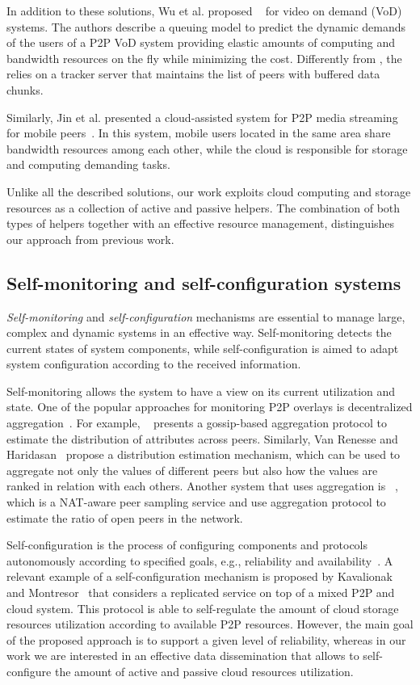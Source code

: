 {In addition to these solutions, Wu et al. proposed \cloudmedia~\cite{cloudmedia} for video on demand (VoD) systems. The authors describe a queuing model to predict the dynamic demands of the users of a P2P
VoD system providing elastic amounts of computing and bandwidth resources on the fly while minimizing the cost. Differently from \clive, the \cloudmedia relies on a tracker server that maintains the list of peers with buffered data chunks.

Similarly, Jin et al. presented a cloud-assisted system for P2P media streaming for
mobile peers~\cite{mobilecloud}. In this system, mobile users located in the same area share bandwidth resources among each other, while the cloud is responsible for storage and computing demanding tasks.


Unlike all the described solutions, our work exploits cloud computing and storage resources
as a collection of active and passive helpers. The combination of both types
of helpers together with an effective resource management, distinguishes our
approach from previous work.

\subsection{Self-monitoring and self-configuration systems}

\emph{Self-monitoring} and \emph{self-configuration} mechanisms are essential
to manage large, complex and dynamic systems in an effective way.
Self-monitoring detects the current states of system components, while
self-configuration is aimed to adapt system configuration according to the
received information.

Self-monitoring allows the system to have a view on its current utilization
and state. One of the popular approaches for monitoring P2P overlays is
decentralized aggregation~\cite{aggregation}. For example, \adam~\cite{adam2}
presents a gossip-based aggregation protocol to estimate the distribution of
attributes across peers. Similarly, Van Renesse and
Haridasan~\cite{gossipestimation} propose a distribution estimation mechanism,
which can be used to aggregate not only the values of different peers but also
how the values are ranked in relation with each others. Another system that
uses aggregation is \croupier~\cite{croupier}, which is a NAT-aware peer
sampling service and use aggregation protocol to estimate the ratio of open
peers in the network.

Self-configuration is the process of configuring components and
protocols autonomously according to specified goals, e.g., reliability and
availability~\cite{loop,self,tman,kavalionak:iwsos12}. A relevant example of a
self-configuration mechanism is proposed by Kavalionak and
Montresor~\cite{kavalionak:iwsos12} that considers a replicated service on top of
a mixed P2P and cloud system. This protocol is able to self-regulate the
amount of cloud storage resources utilization according to available P2P
resources. However, the main goal of the proposed approach is to support a
given level of reliability, whereas in our work we are interested in an
effective data dissemination that allows to self-configure the amount of
active and passive cloud resources utilization.

}
